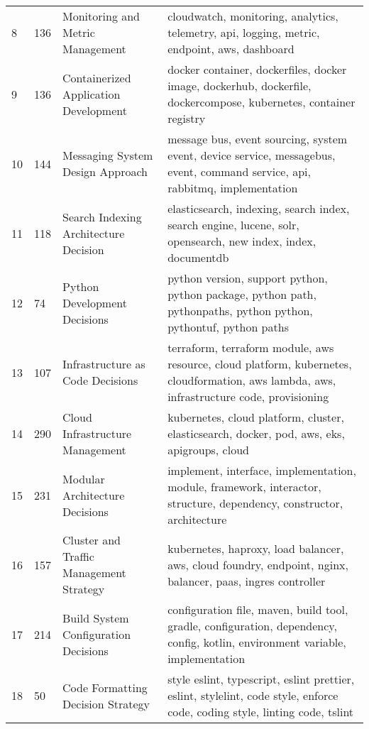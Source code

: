 \begin{longtable}{|p{1cm} p{1.12cm} p{3.3cm} p{9cm}|}
    8 & 136 & Monitoring and Metric Management & cloudwatch, monitoring, analytics, telemetry, api, logging, metric, endpoint, aws, dashboard \\
    
    9 & 136 & Containerized Application Development & docker container, dockerfiles, docker image, dockerhub, dockerfile, dockercompose, kubernetes, container registry \\
    
    10 & 144 & Messaging System Design Approach & message bus, event sourcing, system event, device service, messagebus, event, command service, api, rabbitmq, implementation \\
    
    11 & 118 & Search Indexing Architecture Decision & elasticsearch, indexing, search index, search engine, lucene, solr, opensearch, new index, index, documentdb \\
    
    12 & 74 & Python Development Decisions & python version, support python, python package, python path, pythonpaths, python python, pythontuf, python paths \\
    
    13 & 107 & Infrastructure as Code Decisions & terraform, terraform module, aws resource, cloud platform, kubernetes, cloudformation, aws lambda, aws, infrastructure code, provisioning \\
    
    14 & 290 & Cloud Infrastructure Management & kubernetes, cloud platform, cluster, elasticsearch, docker, pod, aws, eks, apigroups, cloud \\
    
    15 & 231 & Modular Architecture Decisions & implement, interface, implementation, module, framework, interactor, structure, dependency, constructor, architecture \\
    
    16 & 157 & Cluster and Traffic Management Strategy & kubernetes, haproxy, load balancer, aws, cloud foundry, endpoint, nginx, balancer, paas, ingres controller \\
    
    17 & 214 & Build System Configuration Decisions & configuration file, maven, build tool, gradle, configuration, dependency, config, kotlin, environment variable, implementation \\
    
    18 & 50 & Code Formatting Decision Strategy & style eslint, typescript, eslint prettier, eslint, stylelint, code style, enforce code, coding style, linting code, tslint \\
    

\end{longtable}
